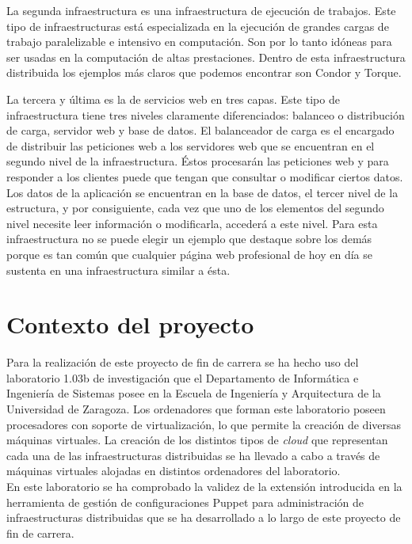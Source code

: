 La segunda infraestructura es una infraestructura de ejecución de trabajos. Este tipo de infraestructuras está especializada en la ejecución de grandes cargas de trabajo paralelizable e intensivo en computación. Son por lo tanto idóneas para ser usadas en la computación de altas prestaciones. Dentro de esta infraestructura distribuida los ejemplos más claros que podemos encontrar son Condor y Torque.

La tercera y última es la de servicios web en tres capas. Este tipo de infraestructura tiene tres niveles claramente diferenciados: balanceo o distribución de carga, servidor web y base de datos. El balanceador de carga es el encargado de distribuir las peticiones web a los servidores web que se encuentran en el segundo nivel de la infraestructura. Éstos procesarán las peticiones web y para responder a los clientes puede que tengan que consultar o modificar ciertos datos. Los datos de la aplicación se encuentran en la base de datos, el tercer nivel de la estructura, y por consiguiente, cada vez que uno de los elementos del segundo nivel necesite leer información o modificarla, accederá a este nivel. Para esta infraestructura no se puede elegir un ejemplo que destaque sobre los demás porque es tan común que cualquier página web profesional de hoy en día se sustenta en una infraestructura similar a ésta.\\


\section{Contexto del proyecto}

Para la realización de este proyecto de fin de carrera se ha hecho uso del laboratorio 1.03b de investigación que el Departamento de Informática e Ingeniería de Sistemas posee en la Escuela de Ingeniería y Arquitectura de la Universidad de Zaragoza. Los ordenadores que forman este laboratorio poseen procesadores con soporte de virtualización, lo que permite la creación de diversas máquinas virtuales. La creación de los distintos tipos de \emph{cloud} que representan cada una de las infraestructuras distribuidas se ha llevado a cabo a través de máquinas virtuales alojadas en distintos ordenadores del laboratorio.\\

En este laboratorio se ha comprobado la validez de la extensión introducida en la herramienta de gestión de configuraciones Puppet para administración de infraestructuras distribuidas que se ha desarrollado a lo largo de este proyecto de fin de carrera.


